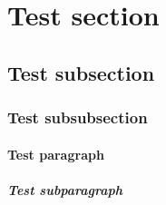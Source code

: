 \documentclass{article}
\begin{document}
\tableofcontents

\section{Test section}
    \subsection{Test subsection}
        \subsubsection{Test subsubsection}

\paragraph{Test paragraph}
\lipsum[2]

\subparagraph{Test subparagraph}
\lipsum[2]
\end{document}
